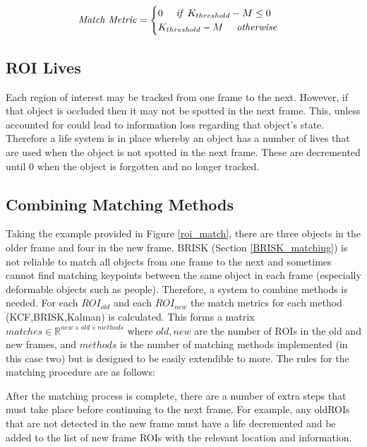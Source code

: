 \documentclass[11pt,twoside]{report}
\begin{document}
\begin{equation}
\begin{aligned}
\textnormal{\textit{Match Metric}} = 
\begin{cases}
0 \quad \textnormal{\textit{ if }} K_{threshold}-M \leq 0 \\
K_{threshold}-M \quad \textnormal{\textit{ otherwise}}
\end{cases}
\end{aligned}
\end{equation}


\subsection{ROI Lives}
Each region of interest may be tracked from one frame to the next. However, if that object is occluded then it may not be spotted in the next frame. This, unless accounted for could lead to information loss regarding that object's state. Therefore a life system is in place whereby an object has a number of lives that are used when the object is not spotted in the next frame. These are decremented until 0 when the object is forgotten and no longer tracked.  


\subsection{Combining Matching Methods} \label{matching_combining_methods}
Taking the example provided in Figure \ref{roi_match}, there are three objects in the older frame and four in the new frame. BRISK (Section \ref{BRISK_matching}) is not reliable to match all objects from one frame to the next and sometimes cannot find matching keypoints between the same object in each frame (especially deformable objects such as people). Therefore, a system to combine methods is needed. For each $ROI_{old}$ and each $ROI_{new}$ the match metrics for each method (KCF,BRISK,Kalman) is calculated. This forms a matrix $matches \in \mathbb{R}^{new \times old \times methods}$ where $old,new$ are the number of ROIs in the old and new frames, and 
$methods$ is the number of matching methods implemented (in this case two) but is designed to be easily extendible to more. The rules for the matching procedure are as follows:


After the matching process is complete, there are a number of extra steps that must take place before continuing to the next frame. For example, any oldROIs that are not detected in the new frame must have a life decremented and be added to the list of new frame ROIs with the relevant location and information.
\end{document}
